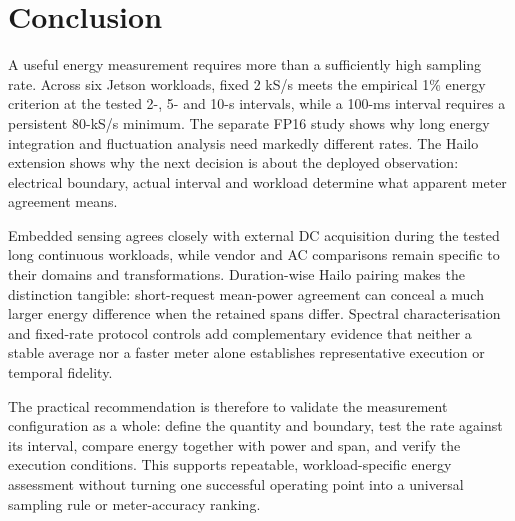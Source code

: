 \section{Conclusion}
A useful energy measurement requires more than a sufficiently high sampling rate. Across six Jetson workloads, fixed 2 kS/s meets the empirical 1\% energy criterion at the tested 2-, 5- and 10-s intervals, while a 100-ms interval requires a persistent 80-kS/s minimum. The separate FP16 study shows why long energy integration and fluctuation analysis need markedly different rates. The Hailo extension shows why the next decision is about the deployed observation: electrical boundary, actual interval and workload determine what apparent meter agreement means.

Embedded sensing agrees closely with external DC acquisition during the tested long continuous workloads, while vendor and AC comparisons remain specific to their domains and transformations. Duration-wise Hailo pairing makes the distinction tangible: short-request mean-power agreement can conceal a much larger energy difference when the retained spans differ. Spectral characterisation and fixed-rate protocol controls add complementary evidence that neither a stable average nor a faster meter alone establishes representative execution or temporal fidelity.

The practical recommendation is therefore to validate the measurement configuration as a whole: define the quantity and boundary, test the rate against its interval, compare energy together with power and span, and verify the execution conditions. This supports repeatable, workload-specific energy assessment without turning one successful operating point into a universal sampling rule or meter-accuracy ranking.
